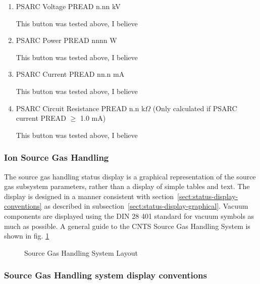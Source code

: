 \documentclass[11pt]{book}		%
\begin{document}
\begin{enumerate}
 \item PSARC Voltage PREAD n.nn kV

\color{red}
This button was tested above, I believe
\color{black}

 \item PSARC Power PREAD nnnn W

\color{red}
This button was tested above, I believe
\color{black}

 \item PSARC Current PREAD nn.n mA

\color{red}
This button was tested above, I believe
\color{black}

 \item PSARC Circuit Resistance PREAD  n.n k$\Omega$ (Only calculated if PSARC current PREAD $\geq$ 1.0 mA)

\color{red}
This button was tested above, I believe
\color{black}

\end{enumerate}

\subsubsection{Ion Source Gas Handling}

The source gas handling status display is a graphical representation of the source gas subsystem parameters, rather than a display of simple tables and text.  The display is designed in a manner consistent with section~\ref{sect:status-display-conventions} as described in subsection~\ref{sect:status-display-graphical}.  Vacuum components are displayed using the DIN 28 401 standard for vacuum symbols as much as possible.  A general guide to the CNTS Source Gas Handling System is shown in fig. \ref{fig:source-gas-layout}

\newpage

\begin{center}

\begin{figure}[htb]
\caption{Source Gas Handling System Layout}
\label{fig:source-gas-layout}
\end{figure}
\end{center}


\subsubsection{Source Gas Handling system display conventions}
\end{document}
